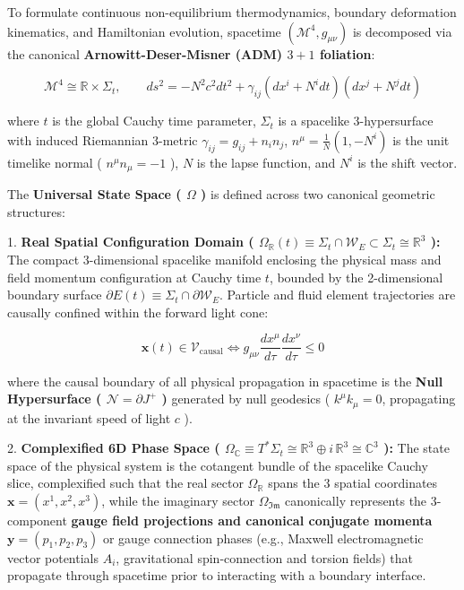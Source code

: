 \documentclass[11pt,a4paper]{article}
\theoremstyle{definition}\newtheorem{definition}{Definition}
\theoremstyle{remark}\newtheorem{remark}{Remark}
\begin{document}
To formulate continuous non-equilibrium thermodynamics, boundary deformation kinematics, and Hamiltonian evolution, spacetime $(\mathcal{M}^4, g_{\mu\nu})$ is decomposed via the canonical \textbf{Arnowitt-Deser-Misner (ADM) $3+1$ foliation}:


\begin{equation}
\mathcal{M}^4 \cong \mathbb{R} \times \Sigma_t, \qquad ds^2 = -N^2 c^2 dt^2 + \gamma_{ij} (dx^i + N^i dt)(dx^j + N^j dt)
\end{equation}


where $t$ is the global Cauchy time parameter, $\Sigma_t$ is a spacelike 3-hypersurface with induced Riemannian 3-metric $\gamma_{ij} = g_{ij} + n_i n_j$, $n^\mu = \frac{1}{N}(1, -N^i)$ is the unit timelike normal ( $n^\mu n_\mu = -1$ ), $N$ is the lapse function, and $N^i$ is the shift vector.

The \textbf{Universal State Space ( $\Omega$ )} is defined across two canonical geometric structures:

1. \textbf{Real Spatial Configuration Domain ( $\Omega_{\mathbb{R}}(t) \equiv \Sigma_t \cap \mathcal{W}_E \subset \Sigma_t \cong \mathbb{R}^3$ ):}
The compact 3-dimensional spacelike manifold enclosing the physical mass and field momentum configuration at Cauchy time $t$, bounded by the 2-dimensional boundary surface $\partial E(t) \equiv \Sigma_t \cap \partial \mathcal{W}_E$. Particle and fluid element trajectories are causally confined within the forward light cone:


\begin{equation}
\mathbf{x}(t) \in \mathcal{V}_{\text{causal}} \iff g_{\mu\nu} \frac{dx^\mu}{d\tau} \frac{dx^\nu}{d\tau} \le 0
\end{equation}


where the causal boundary of all physical propagation in spacetime is the \textbf{Null Hypersurface ( $\mathcal{N} = \partial J^+$ )} generated by null geodesics ( $k^\mu k_\mu = 0$, propagating at the invariant speed of light $c$ ).

2. \textbf{Complexified 6D Phase Space ( $\Omega_{\mathbb{C}} \equiv T^*\Sigma_t \cong \mathbb{R}^3 \oplus i \, \mathbb{R}^3 \cong \mathbb{C}^3$ ):}
The state space of the physical system is the cotangent bundle of the spacelike Cauchy slice, complexified such that the real sector $\Omega_{\mathbb{R}}$ spans the 3 spatial coordinates $\mathbf{x} = (x^1, x^2, x^3)$, while the imaginary sector $\Omega_{\mathfrak{Im}}$ canonically represents the 3-component \textbf{gauge field projections and canonical conjugate momenta} $\mathbf{y} = (p_1, p_2, p_3)$ or gauge connection phases (e.g., Maxwell electromagnetic vector potentials $A_i$, gravitational spin-connection and torsion fields) that propagate through spacetime prior to interacting with a boundary interface.
\end{document}
